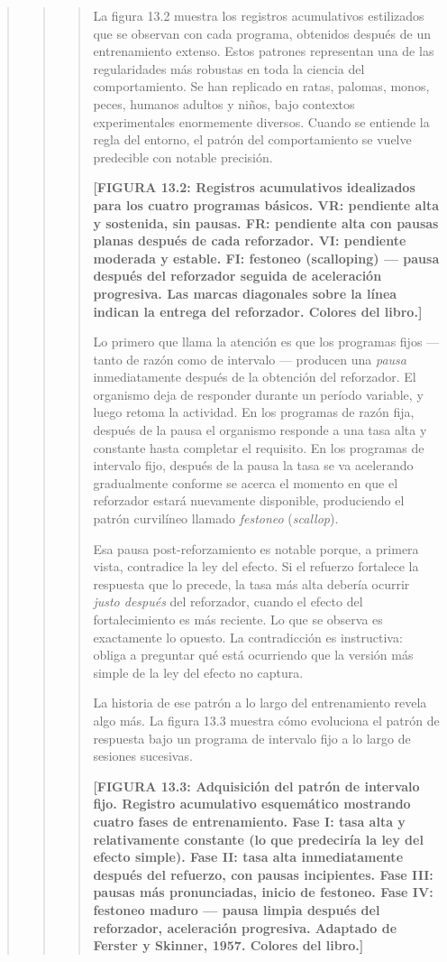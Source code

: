 \documentclass[
  letterpaper,
  DIV=11,
  numbers=noendperiod]{scrreprt}
\begin{document}
\begin{tcolorbox}[enhanced jigsaw, toprule=.15mm, arc=.35mm, colback=white, opacityback=0, colframe=quarto-callout-note-color-frame, breakable, rightrule=.15mm, left=2mm, leftrule=.75mm, bottomrule=.15mm]
\begin{quote}
\begin{quote}
\begin{quote}
La figura 13.2 muestra los registros acumulativos estilizados que se
observan con cada programa, obtenidos después de un entrenamiento
extenso. Estos patrones representan una de las regularidades más
robustas en toda la ciencia del comportamiento. Se han replicado en
ratas, palomas, monos, peces, humanos adultos y niños, bajo contextos
experimentales enormemente diversos. Cuando se entiende la regla del
entorno, el patrón del comportamiento se vuelve predecible con notable
precisión.

\textbf{{[}FIGURA 13.2: Registros acumulativos idealizados para los
cuatro programas básicos. VR: pendiente alta y sostenida, sin pausas.
FR: pendiente alta con pausas planas después de cada reforzador. VI:
pendiente moderada y estable. FI: festoneo (scalloping) --- pausa
después del reforzador seguida de aceleración progresiva. Las marcas
diagonales sobre la línea indican la entrega del reforzador. Colores del
libro.{]}}

Lo primero que llama la atención es que los programas fijos --- tanto de
razón como de intervalo --- producen una \emph{pausa} inmediatamente
después de la obtención del reforzador. El organismo deja de responder
durante un período variable, y luego retoma la actividad. En los
programas de razón fija, después de la pausa el organismo responde a una
tasa alta y constante hasta completar el requisito. En los programas de
intervalo fijo, después de la pausa la tasa se va acelerando
gradualmente conforme se acerca el momento en que el reforzador estará
nuevamente disponible, produciendo el patrón curvilíneo llamado
\emph{festoneo} (\emph{scallop}).

Esa pausa post-reforzamiento es notable porque, a primera vista,
contradice la ley del efecto. Si el refuerzo fortalece la respuesta que
lo precede, la tasa más alta debería ocurrir \emph{justo después} del
reforzador, cuando el efecto del fortalecimiento es más reciente. Lo que
se observa es exactamente lo opuesto. La contradicción es instructiva:
obliga a preguntar qué está ocurriendo que la versión más simple de la
ley del efecto no captura.

La historia de ese patrón a lo largo del entrenamiento revela algo más.
La figura 13.3 muestra cómo evoluciona el patrón de respuesta bajo un
programa de intervalo fijo a lo largo de sesiones sucesivas.

\textbf{{[}FIGURA 13.3: Adquisición del patrón de intervalo fijo.
Registro acumulativo esquemático mostrando cuatro fases de
entrenamiento. Fase I: tasa alta y relativamente constante (lo que
predeciría la ley del efecto simple). Fase II: tasa alta inmediatamente
después del refuerzo, con pausas incipientes. Fase III: pausas más
pronunciadas, inicio de festoneo. Fase IV: festoneo maduro --- pausa
limpia después del reforzador, aceleración progresiva. Adaptado de
Ferster y Skinner, 1957. Colores del libro.{]}}


\end{quote}
\end{quote}
\end{quote}
\end{tcolorbox}
\end{document}
